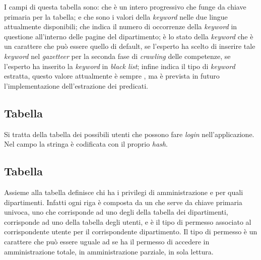 \documentclass[tesi.tex]{subfiles}
\begin{document}
I campi di questa tabella sono:  che \`e un intero progressivo
che funge da chiave primaria per la tabella;  e
 che sono i valori della \emph{keyword} nelle due lingue
attualmente disponibili;  che indica  il numero
di occorrenze della \emph{keyword} in questione all'interno delle
pagine del dipartimento;  \`e lo stato della
\emph{keyword} che \`e un carattere che pu\`o essere  quello di
default,  se l'esperto ha scelto di inserire tale
\emph{keyword} nel \emph{gazetteer} per la seconda fase di
\emph{crawling} delle competenze,  se l'esperto ha inserito
la \emph{keyword} in \emph{black list}; infine  indica il
tipo di \emph{keyword} estratta, questo valore attualmente \`e sempre , ma
\`e prevista in futuro l'implementazione dell'estrazione dei
predicati.

\subsection{Tabella }
\begin{center}
\end{center}
Si tratta della tabella dei possibili utenti che possono fare
\emph{login} nell'applicazione. Nel campo  la stringa
\`e codificata con il proprio \emph{hash}.

\subsection{Tabella }
\begin{center}
\end{center}
Assieme alla tabella  definisce chi ha i privilegi di
amministrazione e per quali dipartimenti. Infatti ogni riga \`e
composta da un  che serve da chiave primaria univoca, uno
 che corrisponde ad uno degli  della tabella
 dei dipartimenti,  corrisponde ad
uno  della tabella  degli utenti, e  \`e
il tipo di permesso associato al corrispondente utente per il
corrispondente dipartimento. Il tipo di permesso  \`e un
carattere che pu\`o essere uguale ad  se ha il permesso di
accedere in amministrazione totale,  in amministrazione
parziale,  in sola lettura.
\end{document}
